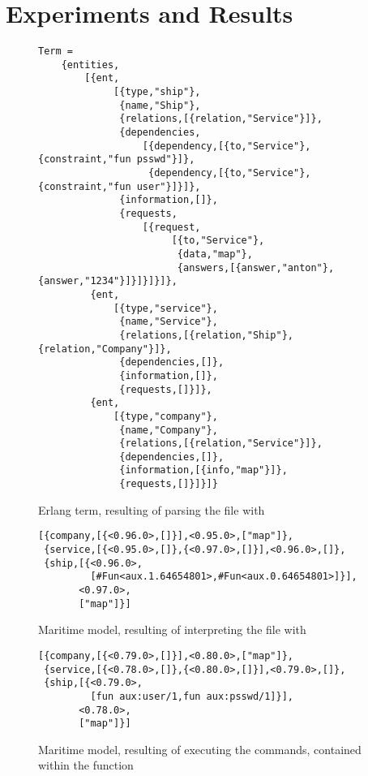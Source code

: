 \chapter{Experiments and Results}

\begin{figure}
	\centering
	\begin{lstlisting}[keywordstyle={}]
Term =
    {entities,
        [{ent,
             [{type,"ship"},
              {name,"Ship"},
              {relations,[{relation,"Service"}]},
              {dependencies,
                  [{dependency,[{to,"Service"},{constraint,"fun psswd"}]},
                   {dependency,[{to,"Service"},{constraint,"fun user"}]}]},
              {information,[]},
              {requests,
                  [{request,
                       [{to,"Service"},
                        {data,"map"},
                        {answers,[{answer,"anton"},{answer,"1234"}]}]}]}]},
         {ent,
             [{type,"service"},
              {name,"Service"},
              {relations,[{relation,"Ship"},{relation,"Company"}]},
              {dependencies,[]},
              {information,[]},
              {requests,[]}]},
         {ent,
             [{type,"company"},
              {name,"Company"},
              {relations,[{relation,"Service"}]},
              {dependencies,[]},
              {information,[{info,"map"}]},
              {requests,[]}]}]}
	\end{lstlisting}
	\caption{Erlang term, resulting of parsing the file  with }
	\label{fig:protocolParsed}
\end{figure}


\begin{figure}
	\centering
	\begin{lstlisting}[keywordstyle={}]
[{company,[{<0.96.0>,[]}],<0.95.0>,["map"]},
 {service,[{<0.95.0>,[]},{<0.97.0>,[]}],<0.96.0>,[]},
 {ship,[{<0.96.0>,
         [#Fun<aux.1.64654801>,#Fun<aux.0.64654801>]}],
       <0.97.0>,
       ["map"]}]
	\end{lstlisting}
	\caption{Maritime model, resulting of interpreting the file  with }
	\label{fig:protocolParsedInterpreted}
\end{figure}

\begin{figure}
  \centering
  \begin{lstlisting}[keywordstyle={}]
[{company,[{<0.79.0>,[]}],<0.80.0>,["map"]},
 {service,[{<0.78.0>,[]},{<0.80.0>,[]}],<0.79.0>,[]},
 {ship,[{<0.79.0>,
         [fun aux:user/1,fun aux:psswd/1]}],
       <0.78.0>,
       ["map"]}]
  \end{lstlisting}
  \caption{Maritime model, resulting of executing the commands, contained within the function }
  \label{fig:protocolManual}
\end{figure}
